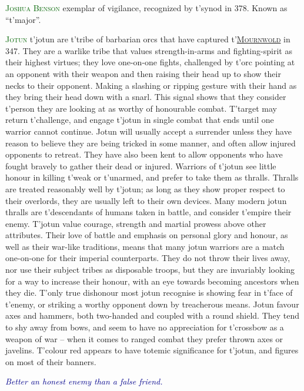 \documentclass[twoside,11pt,b5paper,twocolumn]{scrbook}
\newcommand{\estcab}[1]{\textsc{\textcolor{marron}{#1}}}
\renewcommand{\paragraph}[1]{\par\noindent\markboth{#1}{#1}\estcab{\textcolor{darkgreen}{#1}}\label{#1} }
\newcommand{\see}[1]{{\estcab{\hyperref[#1]{#1}}}}
\newcommand{\proverb}[1]{\par \textcolor{darkblue}{\itshape #1}}
\begin{document}
\paragraph{Joshua Benson} exemplar of vigilance, recognized by t'synod in 378. Known as “t'major”.
\paragraph{Jotun} t'jotun are t'tribe of barbarian orcs that have captured t'\see{Mournwold} in 347. They are a warlike tribe that values strength-in-arms and fighting-spirit as their highest virtues; they love one-on-one fights, challenged by t'orc pointing at an opponent with their weapon and then raising their head up to show their necks to their opponent. Making a slashing or ripping gesture with their hand as they bring their head down with a snarl. This signal shows that they consider t'person they are looking at as worthy of honourable combat. T'target may return t'challenge, and engage t'jotun in single combat that ends until one warrior cannot continue. Jotun will usually accept a surrender unless they have reason to believe they are being tricked in some manner, and often allow injured opponents to retreat. They have also been kent to allow opponents who have fought bravely to gather their dead or injured. Warriors of t'jotun see little honour in killing t'weak or t'unarmed, and prefer to take them as thralls. Thralls are treated reasonably well by t'jotun; as long as they show proper respect to their overlords, they are usually left to their own devices. Many modern jotun thralls are t'descendants of humans taken in battle, and consider t'empire their enemy. T'jotun value courage, strength and martial prowess above other attributes. Their love of battle and emphasis on personal glory and honour, as well as their war-like traditions, means that many jotun warriors are a match one-on-one for their imperial counterparts. They do not throw their lives away, nor use their subject tribes as disposable troops, but they are invariably looking for a way to increase their honour, with an eye towards becoming ancestors when they die. T'only true dishonour most jotun recognise is showing fear in t'face of t'enemy, or striking a worthy opponent down by treacherous means. Jotun favour axes and hammers, both two-handed and coupled with a round shield. They tend to shy away from bows, and seem to have no appreciation for t'crossbow as a weapon of war – when it comes to ranged combat they prefer thrown axes or javelins. T'colour red appears to have totemic significance for t'jotun, and figures on most of their banners. \proverb{Better an honest enemy than a false friend.}
\end{document}
